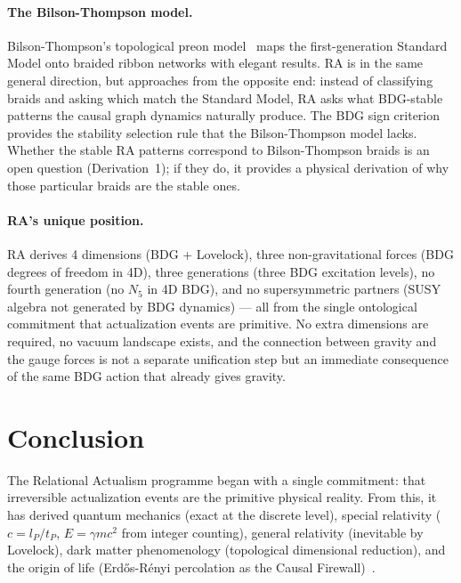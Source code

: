\documentclass[11pt,a4paper]{article}
\begin{document}
\paragraph{The Bilson-Thompson model.} Bilson-Thompson's topological preon
model~\citep{BilsonThompson2005} maps the first-generation Standard Model
onto braided ribbon networks with elegant results. RA is in the same general
direction, but approaches from the opposite end: instead of classifying braids
and asking which match the Standard Model, RA asks what BDG-stable patterns
the causal graph dynamics naturally produce. The BDG sign criterion provides
the stability selection rule that the Bilson-Thompson model lacks. Whether the
stable RA patterns correspond to Bilson-Thompson braids is an open question
(Derivation~1); if they do, it provides a physical derivation of why those
particular braids are the stable ones.

\paragraph{RA's unique position.} RA derives 4 dimensions (BDG + Lovelock),
three non-gravitational forces (BDG degrees of freedom in 4D), three generations
(three BDG excitation levels), no fourth generation (no $N_5$ in 4D BDG), and
no supersymmetric partners (SUSY algebra not generated by BDG dynamics) ---
all from the single ontological commitment that actualization events are
primitive. No extra dimensions are required, no vacuum landscape exists, and
the connection between gravity and the gauge forces is not a separate
unification step but an immediate consequence of the same BDG action that
already gives gravity.

\section{Conclusion}
\label{sec:conclusion}

The Relational Actualism programme began with a single commitment: that
irreversible actualization events are the primitive physical reality. From this,
it has derived quantum mechanics (exact at the discrete level), special
relativity ($c = l_P/t_P$, $E = \gamma mc^2$ from integer counting), general
relativity (inevitable by Lovelock), dark matter phenomenology (topological
dimensional reduction), and the origin of life (Erd\H{o}s-R\'{e}nyi percolation as the Causal Firewall)~\citep{ErdosRenyi1960}.
\end{document}
